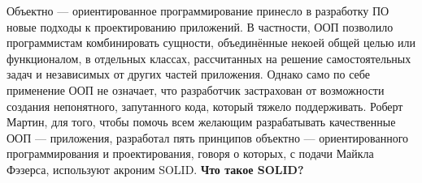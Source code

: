 \documentclass[a4paper]{article}
\begin{document}
\begin{figure}[h]
\end{figure}

Объектно --- ориентированное программирование принесло в разработку ПО новые подходы к проектированию приложений. В частности, ООП позволило программистам комбинировать сущности, объединённые некоей общей целью или функционалом, в отдельных классах, рассчитанных на решение самостоятельных задач и независимых от других частей приложения. Однако само по себе применение ООП не означает, что разработчик застрахован от возможности создания непонятного, запутанного кода, который тяжело поддерживать. Роберт Мартин, для того, чтобы помочь всем желающим разрабатывать качественные ООП --- приложения, разработал пять принципов объектно --- ориентированного программирования и проектирования, говоря о которых, с подачи Майкла Фэзерса, используют акроним SOLID.\@
\newline
\newline
\noindent\textbf{Что такое SOLID?}
\end{document}
